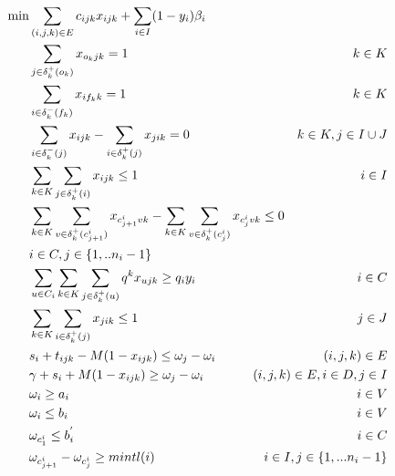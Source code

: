 \documentclass{article}
\begin{document}
{\begin{align}
	\label{obj:sch}  \min &  \sum_{(i,j,k) \in E} c_{ijk}x_{ijk} +  \sum_{i \in I}(1-y_i)\beta_i  &   \\ 
	\label{sch_1}   & \sum_{j \in \delta^{+}_{k}(o_k)}x_{o_kjk} = 1 &  k \in K   \\
	\label{sch_2}   & \sum_{i \in \delta^{-}_{k}(f_k)}x_{if_kk} = 1 &  k \in K  \\
	\label{sch_3}   & \sum_{i \in \delta^{-}_{k}(j)}x_{ijk} - \sum_{i \in \delta^{+}_{k}(j)}x_{jik} = 0 &  k \in K, j \in I \cup J   \\
	\label{sch_4}   &  \sum_{k \in K}\sum_{j \in \delta^{+}_{k}(i)}x_{ijk} \leq 1 &   i \in I    \\
	\label{sch_5}   &  \sum_{k \in K} \sum_{v \in \delta^{+}_{k}(c^{i}_{j+1})}\hspace{-0mm}x_{c^{i}_{j+1}vk} - \sum_{k \in K}\sum_{v \in \delta^{+}_{k}(c^{i}_{j})}\hspace{-0mm}x_{c^{i}_{j}vk}\leq 0 &  \\ \nonumber
      & i \in C, j \in \{1,..n_i-1\} &   \\
    \label{sch_6}   &  \sum_{u \in C_i}\sum_{k \in K}\sum_{j \in \delta^{+}_{k}(u)}q^k x_{ujk}  \geq q_iy_{i} &   i \in C   \\
	\label{sch_7}   &  \sum_{k \in K}\sum_{i \in \delta^{+}_{k}(j)}x_{jik} \leq 1 &   j \in J    \\
	\label{sch_8}   & s_i + t_{ijk} - M(1-x_{ijk})  \leq \omega_j - \omega_i  & \hspace{-20mm}   (i,j,k) \in E    \\
	\label{sch_9}   & \gamma + s_i +  M(1-x_{ijk})  \geq \omega_j - \omega_i  & \hspace{-20mm}  (i,j,k) \in E, i \in D, j \in I    \\
	\label{sch_10}   & \omega_i \geq  a_i   &   i \in V    \\
	\label{sch_11}   &  \omega_i \leq b_i   &   i \in V    \\
	\label{sch_12}   &  \omega_{c^{i}_{1}} \leq b^{'}_{i} &   i \in C    \\
	\label{sch_13}   &  \omega_{c^{i}_{j+1}} - \omega_{c^{i}_{j}} \geq mintl(i) &  \hspace{-20mm}    i \in I, j \in \{1,...n_i-1\}    \\

\end{align}}
\end{document}
